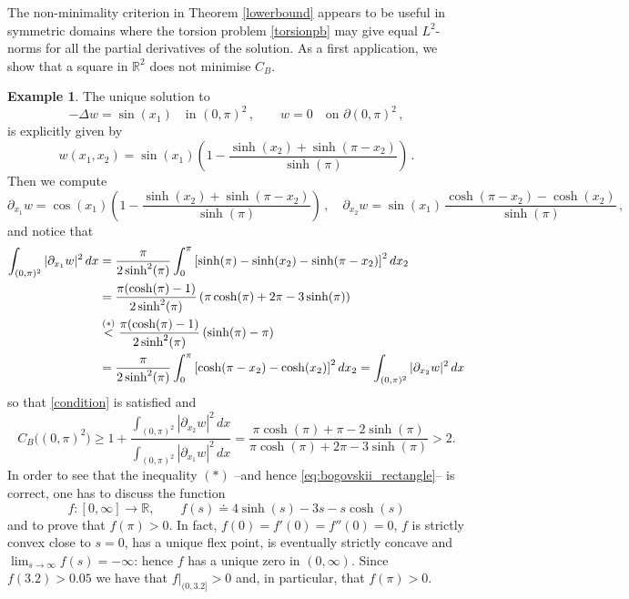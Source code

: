 \documentclass[11pt]{article}
\theoremstyle{plain}
\theoremstyle{definition}
\newtheorem{example}[theorem]{Example}
\numberwithin{equation}{section}
\newcommand{\R}{\mathbb{R}}
\begin{document}
The non-minimality criterion in Theorem \ref{lowerbound} appears to be useful in symmetric domains where the torsion problem \eqref{torsionpb}
may give equal $L^2$-norms for all the partial derivatives of the solution.
As a first application, we show that a square in $\R^2$ does not minimise $C_B$.

\begin{example}\label{Example_3.1}
The unique solution to
$$
-\Delta w=\sin(x_1)\quad\mbox{in }(0,\pi)^2\, ,\qquad w=0\quad\mbox{on }\partial(0,\pi)^2\, ,
$$
is explicitly given by
$$
w(x_1,x_2)=\sin(x_1)\left(1-\frac{\sinh(x_2)+\sinh(\pi-x_2)}{\sinh(\pi)}\right)\, .
$$
Then we compute
$$
\partial_{x_1}w=\cos(x_1)\left(1-\frac{\sinh(x_2)+\sinh(\pi-x_2)}{\sinh(\pi)}\right)\, ,\quad
\partial_{x_2}w=\sin(x_1)\, \frac{\cosh(\pi-x_2)-\cosh(x_2)}{\sinh(\pi)}\, ,
$$
and notice that
\begin{align}
\int_{(0,\pi)^2}|\partial_{x_1}w|^2 \, dx&= %
\frac{\pi}{2\sinh^2(\pi)}\int_{0}^{\pi}\left[\sinh(\pi)-\sinh(x_2)-\sinh(\pi-x_2)\right]^2dx_2 \notag\\
&= \frac{\pi(\cosh(\pi)-1)}{2\sinh^2(\pi)}\left( \pi\cosh(\pi)+2\pi -3\sinh(\pi) \right)\notag\\
&\stackrel{(*)}{<}\frac{\pi(\cosh(\pi)-1)}{2\sinh^2(\pi)}\left( \sinh(\pi)-\pi \right)\notag\\
&= \frac{\pi}{2\sinh^2(\pi)}\int_{0}^{\pi}\left[\cosh(\pi-x_2)-\cosh(x_2)\right]^2dx_2=\int_{(0,\pi)^2}|\partial_{x_2}w|^2\, dx \label{square}
\end{align}
so that \eqref{condition} is satisfied  and
\begin{equation}\label{eq:bogovskii_rectangle}
C_B\big((0,\pi)^2\big)\ge1+\frac{\int_{(0,\pi)^2}|\partial_{x_2}w|^2\, dx}{\int_{(0,\pi)^2}|\partial_{x_1}w|^2 \, dx}=
\frac{ \pi\cosh(\pi)+\pi -2\sinh(\pi)}{ \pi\cosh(\pi)+2\pi -3\sinh(\pi)}>2.
\end{equation}
In order to see that the inequality $(*)$ --and hence \eqref{eq:bogovskii_rectangle}-- is correct, one has to discuss the function
\begin{equation*}
f:[0,\infty]\to\R,\qquad f(s)\doteq 4\sinh(s) -3s-s\cosh(s)
\end{equation*}
and to prove that $f(\pi)>0$. In fact, $f(0)=f'(0)=f''(0)=0$, $f$ is strictly convex close to $s=0$, has a unique flex point, is eventually strictly concave and $\lim_{s\to\infty}f(s)=-\infty $: hence $f$ has a unique zero in $(0,\infty)$. Since $f(3.2) > 0.05$ we have that $f|_{(0,3.2]}>0$ and, in particular, that $f(\pi)>0$.
\end{example}
\end{document}
